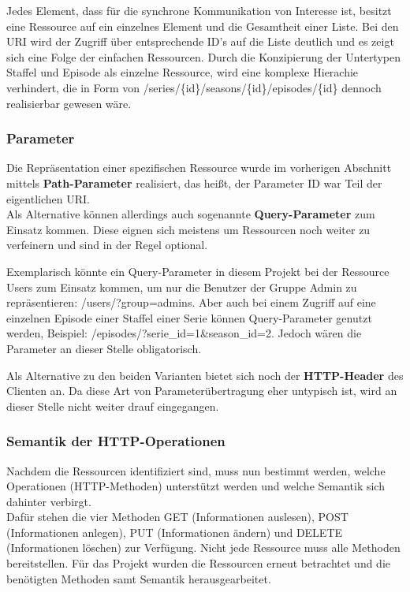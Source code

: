 \documentclass[a4paper]{article}
\begin{document}
Jedes Element, dass für die synchrone Kommunikation von Interesse ist, besitzt eine Ressource auf ein einzelnes Element und die Gesamtheit einer Liste. Bei den URI wird der Zugriff über entsprechende ID's auf die Liste deutlich und es zeigt sich eine Folge der einfachen Ressourcen. Durch die Konzipierung der Untertypen Staffel und Episode als einzelne Ressource, wird eine komplexe Hierachie verhindert, die in Form von /series/\{id\}/seasons/\{id\}/episodes/\{id\} dennoch realisierbar gewesen wäre.


\subsubsection{Parameter}

Die Repräsentation einer spezifischen Ressource wurde im vorherigen Abschnitt mittels \textbf{Path-Parameter} realisiert, das heißt, der Parameter ID war Teil der eigentlichen URI.\\
Als Alternative können allerdings auch sogenannte \textbf{Query-Parameter} zum Einsatz kommen. Diese eignen sich meistens um Ressourcen noch weiter zu verfeinern und sind in der Regel optional.

Exemplarisch könnte ein Query-Parameter in diesem Projekt bei der Ressource Users zum Einsatz kommen, um nur die Benutzer der Gruppe Admin zu repräsentieren: \textsf{/users/?group=admins}. Aber auch bei einem Zugriff auf eine einzelnen Episode einer Staffel einer Serie können Query-Parameter genutzt werden, Beispiel: \textsf{/episodes/?serie\_id=1\&season\_id=2}. Jedoch wären die Parameter an dieser Stelle obligatorisch.

Als Alternative zu den beiden Varianten bietet sich noch der \textbf{HTTP-Header} des Clienten an. Da diese Art von Parameterübertragung eher untypisch ist, wird an dieser Stelle nicht weiter drauf eingegangen.

\subsubsection{Semantik der HTTP-Operationen}

Nachdem die Ressourcen identifiziert sind, muss nun bestimmt werden, welche Operationen (HTTP-Methoden) unterstützt werden und welche Semantik sich dahinter verbirgt.\\
Dafür stehen die vier Methoden GET (Informationen auslesen), POST (Informationen anlegen), PUT (Informationen ändern) und DELETE (Informationen löschen) zur Verfügung. Nicht jede Ressource muss alle Methoden bereitstellen. Für das Projekt wurden die Ressourcen erneut betrachtet und die benötigten Methoden samt Semantik herausgearbeitet.
\end{document}
